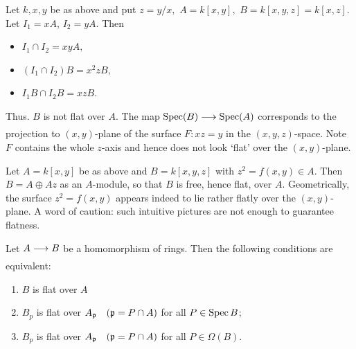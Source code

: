 \documentclass[../main]{subfiles}
\begin{document}
\begin{example}
    Let $k, x, y$ be as above and put  $z = y/x,$  $A = k[x,y],$  $B=k[x,y,z]=k[x,z].$ Let $I_1=xA$, $I_2=yA.$ Then 
    \begin{itemize}
        \item $I_1 \cap I_2 = xyA,$
        \item  $(I_1 \cap I_2)B = x^{2}zB,$
        \item $I_1B \cap I_2B = xzB$.
    \end{itemize}
      Thus. $B$ is not flat over $A$. The map $\Spec(B) \varrightarrow{}  \Spec(A) $ corresponds to the projection to $(x,y)$-plane of the surface $F\colon xz = y  $ in the $(x,y,z)$-space. Note $F$ contains the whole $z$-axis and hence does not look `flat' over the $(x,y)$-plane.
\end{example}

\begin{example}
Let $A = k[x,y]$ be as above and $B = k[x,y,z]$ with \newline $z^{2}=f(x,y) \in A$. Then $B = A \oplus Az$ as an $A$-module, so that $B$ is free, hence flat, over $A$. Geometrically, the surface $z^{2}=f(x,y)$ appears indeed to lie rather flatly over the $(x,y)$-plane. A word of caution: such intuitive pictures are not enough to guarantee flatness.
\end{example}

\newparagraph Let $A \varrightarrow{} B$ be a homomorphism of rings. Then the following conditions are equivalent:
\begin{enumerate} [label=(\arabic*)]
    \item $B$ is flat over $A$
    \item $B_p$ is flat over $A_{\ideal{p}}\for{\ideal{p} = P \cap A}$ for all $P \in \operatorname{Spec}{B}$; 
    \item $B_p$ is flat over $A_{\ideal{p} }\for{\ideal{p} = P \cap A}$ for all $P \in \Omega(B)$.
\end{enumerate}
\end{document}
